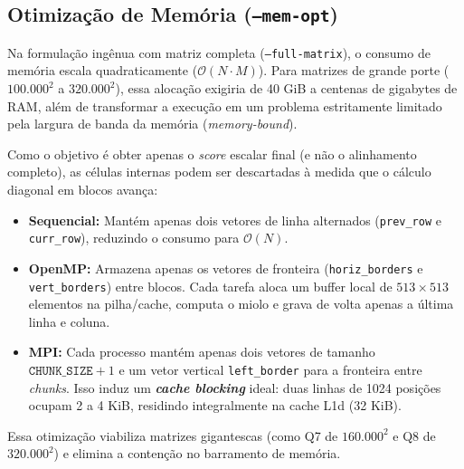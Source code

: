 \subsection{Otimização de Memória (\texttt{--mem-opt})}
\label{sec:memoria}

Na formulação ingênua com matriz completa (\texttt{--full-matrix}), o consumo de memória escala quadraticamente ($\mathcal{O}(N \cdot M)$). Para matrizes de grande porte ($100.000^2$ a $320.000^2$), essa alocação exigiria de 40 GiB a centenas de gigabytes de RAM, além de transformar a execução em um problema estritamente limitado pela largura de banda da memória (\textit{memory-bound}).

Como o objetivo é obter apenas o \textit{score} escalar final (e não o alinhamento completo), as células internas podem ser descartadas à medida que o cálculo diagonal em blocos avança:
\begin{itemize}
    \item \textbf{Sequencial:} Mantém apenas dois vetores de linha alternados (\texttt{prev\_row} e \texttt{curr\_row}), reduzindo o consumo para $\mathcal{O}(N)$.
    \item \textbf{OpenMP:} Armazena apenas os vetores de fronteira (\texttt{horiz\_borders} e \texttt{vert\_borders}) entre blocos. Cada tarefa aloca um buffer local de $513 \times 513$ elementos na pilha/cache, computa o miolo e grava de volta apenas a última linha e coluna.
    \item \textbf{MPI:} Cada processo mantém apenas dois vetores de tamanho $\texttt{CHUNK\_SIZE} + 1$ e um vetor vertical \texttt{left\_border} para a fronteira entre \textit{chunks}. Isso induz um \textbf{\textit{cache blocking}} ideal: duas linhas de 1024 posições ocupam 2 a 4 KiB, residindo integralmente na cache L1d (32 KiB).
\end{itemize}
Essa otimização viabiliza matrizes gigantescas (como Q7 de $160.000^2$ e Q8 de $320.000^2$) e elimina a contenção no barramento de memória.

